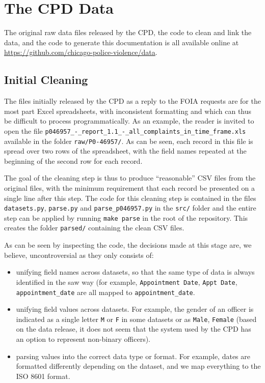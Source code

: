 \section{The CPD Data}

The original raw data files released by the CPD, 
the code to clean and link the data,
and the code to generate this documentation is 
all available online at \url{https://github.com/chicago-police-violence/data}.

\subsection{Initial Cleaning}

The files initially released by the CPD as a reply to the FOIA requests are for
the most part Excel spreadsheets, with inconsistent formatting and which can
thus be difficult to process programmatically. As an example, the reader is
invited to open the file
\texttt{p046957\_-\_report\_1.1\_-\_all\_complaints\_in\_time\_frame.xls}
available in the folder \texttt{raw/P0-46957/}. As can be seen, each record in
this file is spread over two rows of the spreadsheet, with the field names
repeated at the beginning of the second row for each record.

The goal of the cleaning step is thus to produce ``reasonable'' CSV files from
the original files, with the minimum requirement that each record be presented
on a single line after this step. The code for this cleaning step is contained
in the files \texttt{datasets.py}, \texttt{parse.py} and
\texttt{parse\_p046957.py} in the \texttt{src/} folder and the entire step can
be applied by running \texttt{make parse} in the root of the repository. This
creates the folder \texttt{parsed/} containing the clean CSV files.

As can be seen by inspecting the code, the decisions made at this stage are, we
believe, uncontroversial as they only consists of:
\begin{itemize}
	\item unifying field names across datasets, so that the same type of data
		is always identified in the saw way (for example, \texttt{Appointment
		Date}, \texttt{Appt Date}, \texttt{appointment\_date} are all mapped to
		\texttt{appointment\_date}.
	\item unifying field values across datasets. For example, the gender of an
		officer is indicated as a single letter \texttt{M} or \texttt{F} in
		some datasets or as \texttt{Male}, \texttt{Female} (based on the data
		release, it does not seem that the system used by the CPD has an option
		to represent non-binary officers).
	\item parsing values into the correct data type or format. For example,
		dates are formatted differently depending on the dataset, and we map
		everything to the ISO 8601 format.
\end{itemize}

